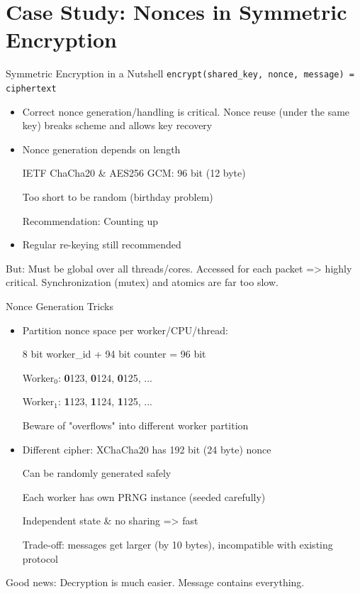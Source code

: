 \documentclass[NET,english]{tumbeamer}
\begin{document}
\section{Case Study: Nonces in Symmetric Encryption}
\begin{frame}{Symmetric Encryption in a Nutshell}
	\texttt{encrypt(shared\_key, nonce, message) = ciphertext}
	

	\pause
	
	\begin{itemize}
		\item Correct nonce generation/handling is critical. Nonce reuse (under the same key) breaks scheme and allows key recovery
		\item Nonce generation depends on length
			 
			 IETF ChaCha20 \& AES256 GCM: 96 bit (12 byte)
			 
			 Too short to be random (birthday problem)
			 
			 Recommendation: Counting up
			 
		\item Regular re-keying still recommended
	\end{itemize}
	
	But: Must be global over all threads/cores. Accessed for each packet => highly critical. Synchronization (mutex) and atomics are far too slow.
	
\end{frame}

\begin{frame}{Nonce Generation Tricks}

	\begin{itemize}
		\item Partition nonce space per worker/CPU/thread: 
		
		8 bit worker\_id + 94 bit counter = 96 bit
		
		Worker$_{0}$: \textbf{0}123, \textbf{0}124, \textbf{0}125, ...
		
		Worker$_{1}$: \textbf{1}123, \textbf{1}124, \textbf{1}125, ...
		
		Beware of "overflows" into different worker partition
		
		\item Different cipher: XChaCha20 has 192 bit (24 byte) nonce
		
		Can be randomly generated safely
		
		Each worker has own PRNG instance (seeded carefully)
		
		Independent state \& no sharing => fast
		
		Trade-off: messages get larger (by 10 bytes), incompatible with existing protocol
	\end{itemize}

	\pause
	Good news: Decryption is much easier. Message contains everything.
\end{frame}
\end{document}
